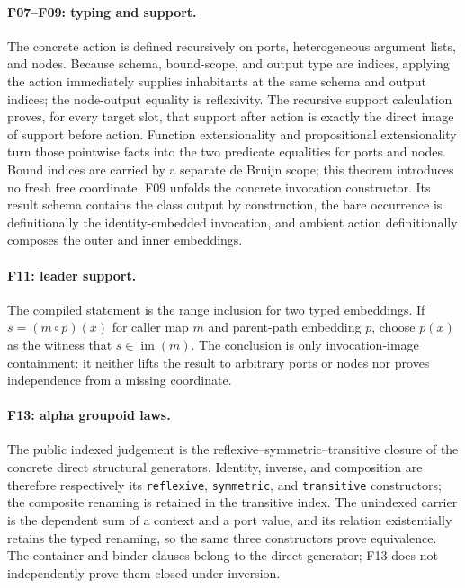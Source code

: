\paragraph{F07--F09: typing and support.}
\label{app:proof-F07}
The concrete action is defined recursively on ports, heterogeneous argument
lists, and nodes.  Because schema, bound-scope, and output type are indices,
applying the action immediately supplies inhabitants at the same schema and
output indices; the node-output equality is reflexivity.
\label{app:proof-F08}
The recursive support calculation proves, for every target slot, that support
after action is exactly the direct image of support before action.  Function
extensionality and propositional extensionality turn those pointwise facts
into the two predicate equalities for ports and nodes.  Bound indices are
carried by a separate de Bruijn scope; this theorem introduces no fresh free
coordinate.
\label{app:proof-F09}
F09 unfolds the concrete invocation constructor.  Its result schema contains
the class output by construction, the bare occurrence is definitionally the
identity-embedded invocation, and ambient action definitionally composes the
outer and inner embeddings.

\paragraph{F11: leader support.}
\label{app:proof-F11}
The compiled statement is the range inclusion for two typed embeddings.  If
$s=(m\circ p)(x)$ for caller map $m$ and parent-path embedding $p$, choose
$p(x)$ as the witness that $s\in\operatorname{im}(m)$.  The conclusion is
only invocation-image containment: it neither lifts the result to arbitrary
ports or nodes nor proves independence from a missing coordinate.

\paragraph{F13: alpha groupoid laws.}
\label{app:proof-F13}
The public indexed judgement is the reflexive--symmetric--transitive closure
of the concrete direct structural generators.  Identity, inverse, and
composition are therefore respectively its \texttt{reflexive},
\texttt{symmetric}, and \texttt{transitive} constructors; the composite
renaming is retained in the transitive index.  The unindexed carrier is the
dependent sum of a context and a port value, and its relation existentially
retains the typed renaming, so the same three constructors prove equivalence.
The container and binder clauses belong to the direct generator; F13 does not
independently prove them closed under inversion.

